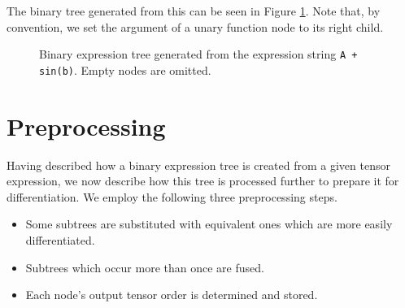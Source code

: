 \documentclass[12pt, a4paper]{report}
\begin{document}
The binary tree generated from this can be seen in Figure \ref{fig:tree_example}.
Note that, by convention, we set the argument of a unary function node to its right child.

\begin{figure}
    \centering
    \caption{Binary expression tree generated from the expression string \texttt{A + sin(b)}. Empty nodes are omitted.}
    \label{fig:tree_example}
\end{figure}

\section{Preprocessing}
Having described how a binary expression tree is created from a given tensor expression, we now describe how this tree is processed further to prepare it for differentiation.
We employ the following three preprocessing steps.
\begin{itemize}
    \item Some subtrees are substituted with equivalent ones which are more easily differentiated.
    \item Subtrees which occur more than once are fused.
    \item Each node's output tensor order is determined and stored.
\end{itemize}
\end{document}
